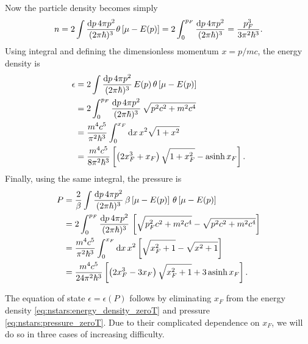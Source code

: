Now the particle density  becomes simply
\begin{equation}
	n = 
	2 \int \frac{\mathop{}\!\mathrm{d} p \, 4 \pi p^2}{(2 \pi \hbar)^3} \theta \left[ \mu - E(p) \right] =
	2 \int_0^{p_F} \frac{\mathop{}\!\mathrm{d} p \, 4 \pi p^2}{(2 \pi \hbar)^3} = \frac{p_F^3}{3 \pi^2 \hbar^3} .
\label{eq:nstars:density_zeroT}
\end{equation}
Using integral  and defining the dimensionless momentum $x = p / mc$, the energy density  is
\begin{equation}
\begin{split}
	\epsilon &=  2 \int \frac{\mathop{}\!\mathrm{d} p \, 4 \pi p^2}{(2 \pi \hbar)^3} \, E(p) \, \theta \left[ \mu - E(p) \right] \\
	         &=  2 \int_0^{p_F} \frac{\mathop{}\!\mathrm{d} p \, 4 \pi p^2}{(2 \pi \hbar)^3} \, \sqrt{p^2 c^2 + m^2 c^4} \\
	         &= \frac{m^4 c^5}{\pi^2 \hbar^3} \int_0^{x_F} \mathop{}\!\mathrm{d} x \, x^2 \sqrt{1 + x^2} \\
	         &= \frac{m^4 c^5}{8 \pi^2 \hbar^3} \left[ \left( 2 x_F^3 + x_F \right) \sqrt{1 + x_F^2} - \operatorname{asinh} x_F \right] . \\
\end{split}
\label{eq:nstars:energy_density_zeroT}
\end{equation}
Finally, using the same integral, the pressure  is
\begin{equation}
\begin{split}
	P &= \frac{2}{\beta} \int \frac{\mathop{}\!\mathrm{d} p \, 4 \pi p^2}{(2 \pi \hbar)^3} \, \beta \left[ \mu - E(p) \right] \, \theta \left[ \mu - E(p) \right] \\
	  &= 2 \int_0^{p_F} \frac{\mathop{}\!\mathrm{d} p \, 4 \pi p^2}{(2 \pi \hbar)^3} \, \left[ \sqrt{p_F^2 c^2 + m^2 c^4} - \sqrt{p^2 c^2 + m^2 c^4} \right] \\
	  &= \frac{m^4 c^5}{\pi^2 \hbar^3} \int_0^{x_F} \mathop{}\!\mathrm{d} x \, x^2 \left[ \sqrt{x_F^2+1} - \sqrt{x^2+1} \right] \\
	  &= \frac{m^4 c^5}{24 \pi^2 \hbar^3} \left[ \left( 2 x_F^3 - 3 x_F \right) \sqrt{x_F^2 + 1} + 3 \operatorname{asinh} x_F \right] . \\
\end{split}
\label{eq:nstars:pressure_zeroT}
\end{equation}

The equation of state $\epsilon = \epsilon(P)$ follows by eliminating $x_F$ from the energy density \eqref{eq:nstars:energy_density_zeroT} and pressure \eqref{eq:nstars:pressure_zeroT}.
Due to their complicated dependence on $x_F$, we will do so in three cases of increasing difficulty.

